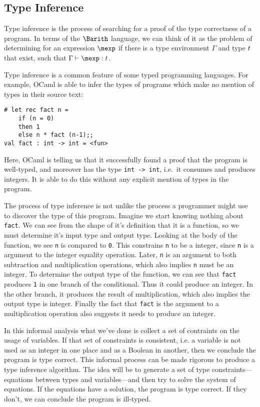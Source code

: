 \subsection{Type Inference}


Type inference is the process of searching for a proof of the type
correctness of a program.  In terms of the $\Barith$ language, we can
think of it as the problem of determining for an expression $\mexp$ if
there is a type environment $\Gamma$ and type $t$ that exist,
such that $\typevaljudge\Gamma\mexp\mtype$.

Type inference is a common feature of some typed programming
languages.  For example, OCaml is able to infer the types of programs
which make no mention of types in their source text:
\begin{verbatim}
# let rec fact n =
    if (n = 0)
    then 1
    else n * fact (n-1);;
val fact : int -> int = <fun>
\end{verbatim}
Here, OCaml is telling us that it successfully found a proof that the
program is well-typed, and moreover has the type {\tt int -> int},
i.e.~it consumes and produces integers.  It is able to do this without
any explicit mention of types in the program.

The process of type inference is not unlike the process a programmer
might use to discover the type of this program.  Imagine we start
knowing nothing about {\tt fact}.  We can see from the shape of it's
definition that it is a function, so we must determine it's input type
and output type.  Looking at the body of the function, we see {\tt n}
is compared to {\tt 0}.  This constrains {\tt n} to be a integer,
since {\tt n} is a argument to the integer equality operation.  Later,
{\tt n} is an argument to both subtraction and multiplication
operations, which also implies {\tt n} must be an integer.  To
determine the output type of the function, we can see that {\tt fact}
produces {\tt 1} in one branch of the conditional.  Thus it could
produce an integer.  In the other branch, it produces the result of
multiplication, which also implies the output type is integer.
Finally the fact that {\tt fact} is the argument to a multiplication
operation also suggests it needs to produce an integer.

In this informal analysis what we've done is collect a set of
contraints on the usage of variables.  If that set of constraints is
consistent, i.e. a variable is not used as an integer in one place and
as a Boolean in another, then we conclude the program is type correct.
This informal process can be made rigorous to produce a type inference
algorithm.  The idea will be to generate a set of type
constraints---equations between types and variables---and then try to
solve the system of equations.  If the equations have a solution, the
program is type correct.  If they don't, we can conclude the program
is ill-typed.


